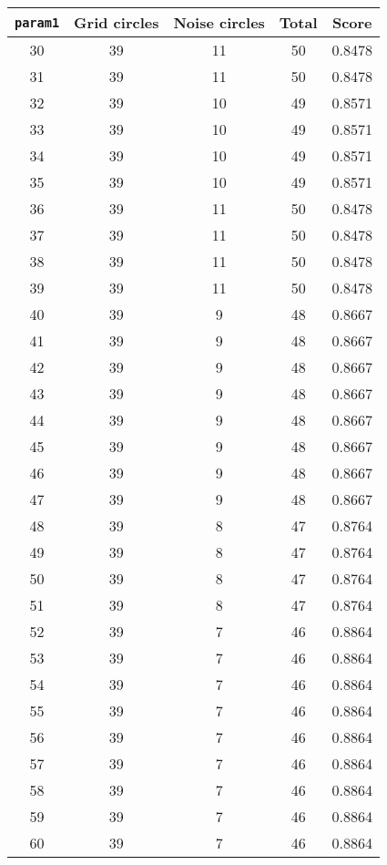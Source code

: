 \documentclass[letterpaper, 12pt]{article}
\begin{document}
\begin{longtable}{|c|c|c|c|c|}
\hline
\textbf{\texttt{param1}} & \textbf{Grid circles} & \textbf{Noise circles} & \textbf{Total} & \textbf{Score} \\
\hline
30 & 39 & 11 & 50 & 0.8478 \\
\hline
31 & 39 & 11 & 50 & 0.8478 \\
\hline
32 & 39 & 10 & 49 & 0.8571 \\
\hline
33 & 39 & 10 & 49 & 0.8571 \\
\hline
34 & 39 & 10 & 49 & 0.8571 \\
\hline
35 & 39 & 10 & 49 & 0.8571 \\
\hline
36 & 39 & 11 & 50 & 0.8478 \\
\hline
37 & 39 & 11 & 50 & 0.8478 \\
\hline
38 & 39 & 11 & 50 & 0.8478 \\
\hline
39 & 39 & 11 & 50 & 0.8478 \\
\hline
40 & 39 & 9 & 48 & 0.8667 \\
\hline
41 & 39 & 9 & 48 & 0.8667 \\
\hline
42 & 39 & 9 & 48 & 0.8667 \\
\hline
43 & 39 & 9 & 48 & 0.8667 \\
\hline
44 & 39 & 9 & 48 & 0.8667 \\
\hline
45 & 39 & 9 & 48 & 0.8667 \\
\hline
46 & 39 & 9 & 48 & 0.8667 \\
\hline
47 & 39 & 9 & 48 & 0.8667 \\
\hline
48 & 39 & 8 & 47 & 0.8764 \\
\hline
49 & 39 & 8 & 47 & 0.8764 \\
\hline
50 & 39 & 8 & 47 & 0.8764 \\
\hline
51 & 39 & 8 & 47 & 0.8764 \\
\hline
52 & 39 & 7 & 46 & 0.8864 \\
\hline
53 & 39 & 7 & 46 & 0.8864 \\
\hline
54 & 39 & 7 & 46 & 0.8864 \\
\hline
55 & 39 & 7 & 46 & 0.8864 \\
\hline
56 & 39 & 7 & 46 & 0.8864 \\
\hline
57 & 39 & 7 & 46 & 0.8864 \\
\hline
58 & 39 & 7 & 46 & 0.8864 \\
\hline
59 & 39 & 7 & 46 & 0.8864 \\
\hline
60 & 39 & 7 & 46 & 0.8864 \\
\hline

\end{longtable}
\end{document}

